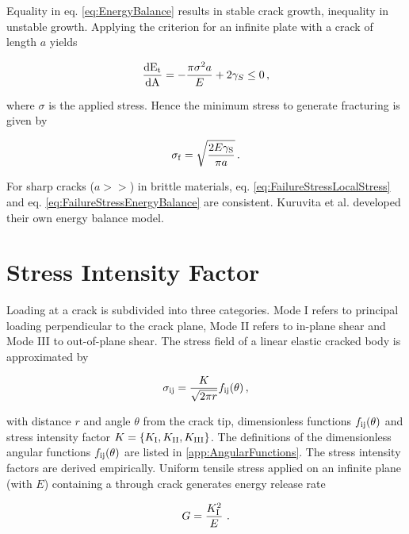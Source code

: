 \documentclass[12pt,twoside]{article}
\begin{document}
Equality in eq. \ref{eq:EnergyBalance} results in stable crack growth, inequality in unstable growth. Applying the criterion for an infinite plate with a crack of length $a$ yields

\begin{equation}
\frac{\rm{d}E_{\rm{t}}}{\rm{d}A}=-\frac{\pi\sigma^2a}{E}+2\gamma_S\leq0\,,
\end{equation}

where $\sigma$ is the applied stress. Hence the minimum stress to generate fracturing is given by

\begin{equation}
    \label{eq:FailureStressEnergyBalance}
    \sigma_{\rm{f}} = \sqrt{\frac{2E\gamma_{\rm{S}}}{\pi a}}\,.
\end{equation}

For sharp cracks ($a>>$) in brittle materials, eq. \ref{eq:FailureStressLocalStress} and eq. \ref{eq:FailureStressEnergyBalance} are consistent. Kuruvita et al. \cite{Kur14} developed their own energy balance model.

\section{Stress Intensity Factor}

Loading at a crack is subdivided into three categories. Mode I refers to principal loading perpendicular to the crack plane, Mode II refers to in-plane shear and Mode III to out-of-plane shear. The stress field of a linear elastic cracked body is approximated by

\begin{equation}
    \sigma_{\rm{ij}}=\frac{K}{\sqrt{2\pi r}}f_{\rm{ij}}(\theta)\,,
\end{equation}

with distance $r$ and angle $\theta$ from the crack tip, dimensionless functions $f_{\rm{ij}}(\theta)$ and stress intensity factor $K=\{K_{\rm{I}},K_{\rm{II}},K_{\rm{III}}\}$. The definitions of the dimensionless angular functions $f_{\rm{ij}}(\theta)$ are listed in \autoref{app:AngularFunctions}. The stress intensity factors \cite{And05, Xu11} are derived empirically. Uniform tensile stress applied on an infinite plane (with  $E$) containing a through crack generates energy release rate

\begin{equation}
    G = \frac{K_{\rm{I}}^2}{E}\,\,.
\end{equation}
\end{document}
